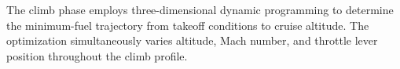 The climb phase employs three-dimensional dynamic programming to determine the minimum-fuel trajectory from takeoff conditions to cruise altitude. The optimization simultaneously varies altitude, Mach number, and throttle lever position throughout the climb profile.
